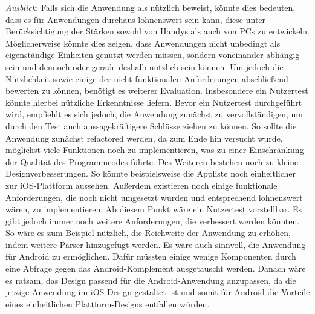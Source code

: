 \myNewSection
\textit{Ausblick}:
		Falls sich die Anwendung als nützlich beweist, könnte dies bedeuten, dass es für Anwendungen durchaus lohnenswert sein kann, diese unter Berücksichtigung der Stärken sowohl von Handys als auch von PCs zu entwickeln. Möglicherweise könnte dies zeigen, dass Anwendungen nicht unbedingt als eigenständige Einheiten genutzt werden müssen, sondern voneinander abhängig sein und dennoch oder gerade deshalb nützlich sein können.
	\newline%
		Um jedoch die Nützlichkeit sowie einige der nicht funktionalen Anforderungen abschließend bewerten zu können, benötigt es weiterer Evaluation. Insbesondere ein Nutzertest könnte hierbei nützliche Erkenntnisse liefern.
	\newline%
	Bevor ein Nutzertest durchgeführt wird, empfiehlt es sich jedoch, die Anwendung zunächst zu vervollständigen, um durch den Test auch aussagekräftigere Schlüsse ziehen zu können.	
		So sollte die Anwendung zunächst \grqq refactored\glqq{} werden, da zum Ende hin versucht wurde, möglichst viele Funktionen noch zu implementieren, was zu einer Einschränkung der Qualität des Programmcodes führte.
		Des Weiteren bestehen noch zu kleine Designverbesserungen. So könnte beispielsweise die Appliste noch einheitlicher zur iOS-Plattform aussehen.
		Außerdem existieren noch einige funktionale Anforderungen, die noch nicht umgesetzt wurden und entsprechend lohnenswert wären, zu implementieren.
	\newline%
	Ab diesem Punkt wäre ein Nutzertest vorstellbar. Es gibt jedoch immer noch weitere Anforderungen, die verbessert werden könnten.
		So wäre es zum Beispiel nützlich, die Reichweite der Anwendung zu erhöhen, indem weitere Parser hinzugefügt werden.
		Es wäre auch sinnvoll, die Anwendung für Android zu ermöglichen. Dafür müssten einige wenige Komponenten durch eine Abfrage gegen das Android-Komplement ausgetauscht werden. Danach wäre es ratsam, das Design passend für die Android-Anwendung anzupassen, da die jetzige Anwendung im iOS-Design gestaltet ist und somit für Android die Vorteile eines einheitlichen Plattform-Designs entfallen würden.
%
%
%